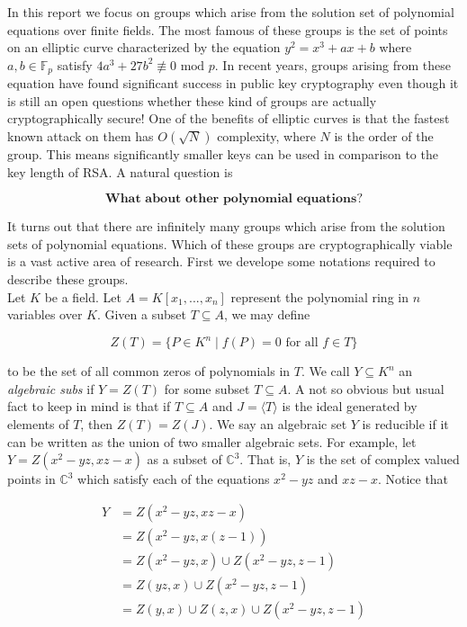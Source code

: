 

In this report we focus on groups which arise from the solution set of polynomial equations over finite fields. The most famous of these groups is the set of points on an elliptic curve characterized by the equation $y^2 = x^3 + ax + b$ where $a,b \in \mathbb{F}_p$ satisfy $4a^3 + 27b^2 \not\equiv 0 \text{ mod } p$. In recent years, groups arising from these equation have found significant success in public key cryptography even though it is still an open questions whether these kind of groups are actually cryptographically secure! One of the benefits of elliptic curves is that the fastest known attack on them has $O(\sqrt{N})$ complexity, where $N$ is the order of the group. This means significantly smaller keys can be used in comparison to the key length of RSA. A natural question is 

$$
\textbf{What about other polynomial equations?}
$$ 

It turns out that there are infinitely many groups which arise from the solution sets of polynomial equations. Which of these groups are cryptographically viable is a vast active area of research. First we develope some notations required to describe these groups. \\ 

Let $K$ be a field. Let $A = K[x_1,...,x_n]$ represent the polynomial ring in $n$ variables over $K$. Given a subset $T \subseteq A$, we may define 

$$
Z(T) = \lbrace P \in K^n \mid f(P) = 0 \text{ for all } f \in T \rbrace 
$$ 

to be the set of all common zeros of polynomials in $T$. We call $Y \subseteq K^n $ an \textit{algebraic subs} if $Y = Z(T)$ for some subset $T \subseteq A$. A not so obvious but usual fact to keep in mind is that if $T \subseteq A$ and $J = \langle T \rangle $ is the ideal generated by elements of $T$, then $Z(T) = Z(J)$. We say an algebraic set $Y$ is reducible if it can be written as the union of two smaller algebraic sets. For example, let $Y = Z(x^2 - yz, xz-x)$ as a subset of $\mathbb{C}^3$. That is, $Y$ is the set of complex valued points in $\mathbb{C}^3$ which satisfy each of the equations $x^2 - yz$ and $xz-x$. Notice that

\begin{align*}
	Y &= Z(x^2 - yz, xz-x) \\
	&= Z(x^2 - yz, x(z-1)) \\
	&= Z(x^2 - yz,x) \cup Z(x^2 - yz,z-1) \\
	&= Z(yz,x) \cup Z(x^2 - yz,z -1) \\
	&= Z(y,x) \cup Z(z,x) \cup Z(x^2 - yz, z - 1)
\end{align*} 

